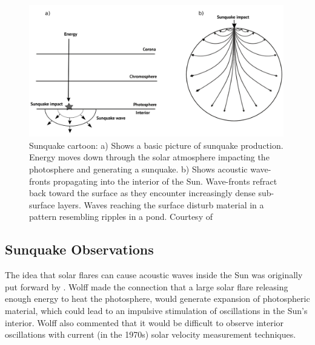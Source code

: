 \begin{figure}[hb]%
  \begin{center}
  \includegraphics[width=0.99\textwidth]{sunquake-cartoon}
  \caption{Sunquake cartoon: a) Shows a basic picture of sunquake production. Energy moves down through the solar atmosphere impacting the photosphere and generating a sunquake. b) Shows acoustic wave-fronts propagating into the interior of the Sun. Wave-fronts refract back toward the surface as they encounter increasingly dense sub-surface layers. Waves reaching the surface disturb material in a pattern resembling ripples in a pond. Courtesy of \cite{2014arXiv1402.1249K}}\label{sunquake-cartoon}
\end{center}
\end{figure}

\subsection{Sunquake Observations}
The idea that solar flares can cause acoustic waves inside the Sun was originally put forward by \citep{1972ApJ...176..833W}. Wolff made the connection that a large solar flare releasing enough energy to heat the photosphere, would generate expansion of photospheric material, which could lead to an impulsive stimulation of oscillations in the Sun's interior. Wolff also commented that it would be difficult to observe interior oscillations with current (in the 1970s) solar velocity measurement techniques.      

